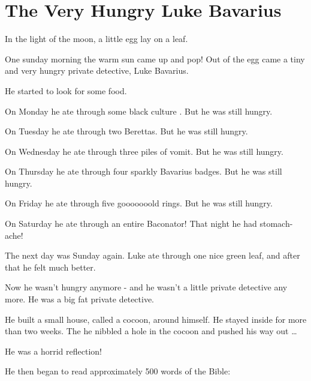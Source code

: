 \chapter{The Very Hungry Luke Bavarius}





In the light of the moon, a little egg lay on a leaf.



One sunday morning the warm sun came up and pop! Out of the egg
came a tiny and very hungry private detective, Luke Bavarius.



He started to look for some food.



On Monday he ate through some black culture . But he was still
hungry.



On Tuesday he ate through two Berettas. But he was still
hungry.



On Wednesday he ate through three piles of vomit. But he was still
hungry.



On Thursday he ate through four sparkly Bavarius badges. But he was
still hungry.



On Friday he ate through five gooooooold rings. But he was still
hungry.



On Saturday he ate through an entire Baconator! That night he had
stomach-ache!



The next day was Sunday again. Luke ate through one nice green
leaf, and after that he felt much better.



Now he wasn't hungry anymore - and he wasn't a little private
detective any more. He was a big fat private detective.



He built a small house, called a cocoon, around himself. He stayed
inside for more than two weeks. The he nibbled a hole in the cocoon
and pushed his way out {\ldots}



He was a horrid reflection!



He then began to read approximately 500 words of the Bible:



